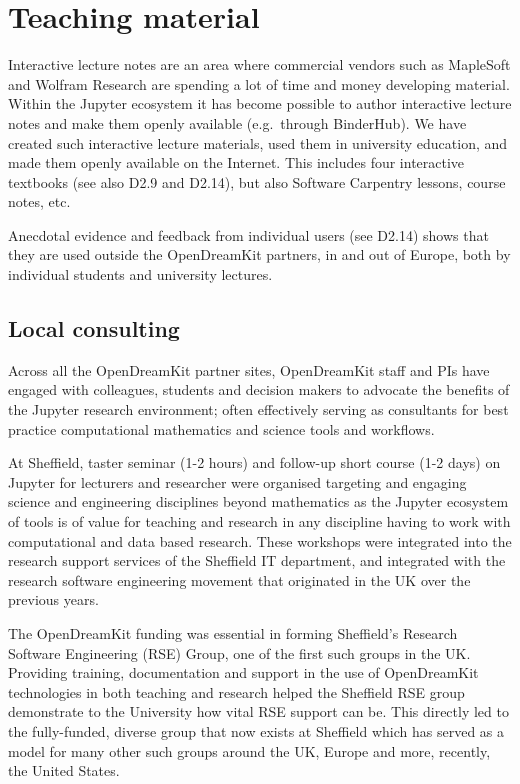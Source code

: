 \documentclass{deliverablereport}
\begin{document}
\section{Teaching material}

Interactive lecture notes are an area where commercial vendors such as
MapleSoft and Wolfram Research are spending a lot of time and money
developing material. Within the Jupyter ecosystem it has become possible
to author interactive lecture notes and make them openly available
(e.g.~through BinderHub). We have created such interactive lecture
materials, used them in university education, and made them openly
available on the Internet. This includes four interactive textbooks (see
also D2.9 and D2.14), but also Software Carpentry lessons, course notes,
etc.

Anecdotal evidence and feedback from individual users (see D2.14) shows
that they are used outside the OpenDreamKit partners, in and out of
Europe, both by individual students and university lectures.

\subsection{Local consulting}

Across all the OpenDreamKit partner sites, OpenDreamKit staff and PIs
have engaged with colleagues, students and decision makers to advocate
the benefits of the Jupyter research environment; often effectively
serving as consultants for best practice computational mathematics and
science tools and workflows.

At Sheffield, taster seminar (1-2 hours) and follow-up short course (1-2
days) on Jupyter for lecturers and researcher were organised targeting
and engaging science and engineering disciplines beyond mathematics as
the Jupyter ecosystem of tools is of value for teaching and research in
any discipline having to work with computational and data based
research. These workshops were integrated into the research support
services of the Sheffield IT department, and integrated with the
research software engineering movement that originated in the UK over
the previous years.

The OpenDreamKit funding was essential in forming Sheffield's Research
Software Engineering (RSE) Group, one of the first such groups in the
UK. Providing training, documentation and support in the use of
OpenDreamKit technologies in both teaching and research helped the
Sheffield RSE group demonstrate to the University how vital RSE support
can be. This directly led to the fully-funded, diverse group that now
exists at Sheffield which has served as a model for many other such
groups around the UK, Europe and more, recently, the United States.
\end{document}
